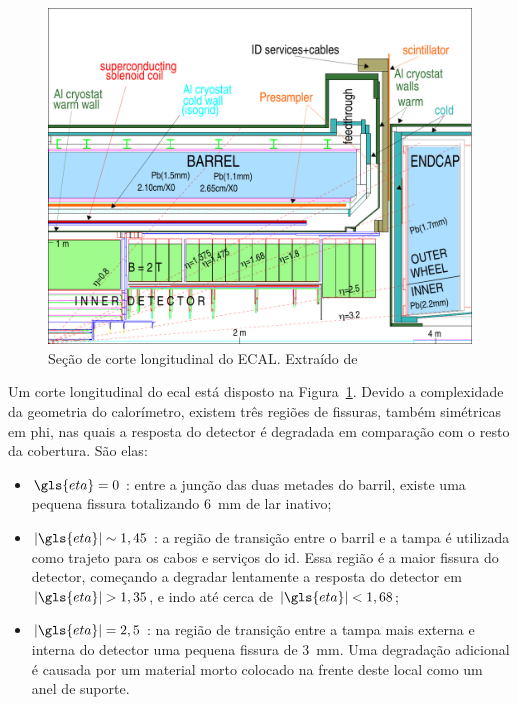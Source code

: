 \begin{figure}
\centering
\includegraphics{imagens/calorimetros_secao.pdf}
\caption[Seção de corte longitudinal do ECAL]
{Seção de corte longitudinal do ECAL. Extraído de
\cite{cal_tdr}}
\label{fig:secao_em_calo}
\end{figure}

Um corte longitudinal do \gls{ecal} está disposto na
Figura~\ref{fig:secao_em_calo}. Devido a complexidade da geometria do
calorímetro, existem três regiões de fissuras, também simétricas em \gls{phi}, 
nas quais a resposta do detector é degradada em comparação com o resto 
da cobertura. São elas:

\begin{itemize}
\item $\gls{eta}=0$ : entre a junção das duas metades do barril, existe uma 
pequena fissura totalizando 6~mm de \gls{lar} inativo;
\item $|\gls{eta}|\sim1,45$ : a região de transição entre o barril e a tampa é
utilizada como trajeto para os cabos e serviços do \gls{id}. Essa região é a
maior fissura do detector, começando a degradar lentamente a resposta do detector em
$|\gls{eta}|>1,35$, e indo até cerca de $|\gls{eta}|<1,68$;
\item $|\gls{eta}|=2,5$ : na região de transição entre a tampa mais externa e
interna do detector uma pequena fissura de 3~mm. Uma degradação adicional é
causada por um material morto colocado na frente deste local como um anel de
suporte.
\end{itemize}

